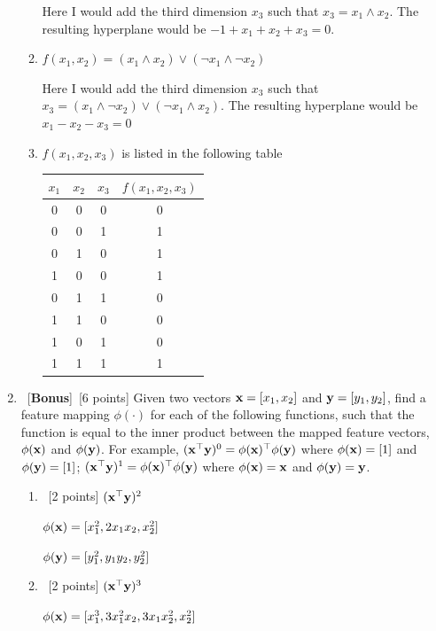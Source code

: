 \documentclass[12pt, fullpage,letterpaper]{article}
\begin{document}
\begin{enumerate}
\begin{enumerate}
		Here I would add the third dimension $x_3$ such that $x_3 = x_1 \land x_2$. The resulting hyperplane would be $-1 + x_1 + x_2 + x_3 = 0$.
		
		\item $f(x_1, x_2) = (x_1 \land x_2) \lor (\neg x_1 \land \neg x_2)$
		
		Here I would add the third dimension $x_3$ such that $x_3 = (x_1 \land \neg x_2) \lor (\neg x_1 \land x_2)$. The resulting hyperplane would be $x_1 - x_2 - x_3 = 0$
		
		\item $f(x_1, x_2, x_3)$ is listed in the following table
		\begin{table}[h]
			\centering
			\begin{tabular}{ccc|c}
				$x_1$ & $x_2$ & $x_3$ &  $f(x_1, x_2, x_3)$\\ 
				\hline\hline
				0 & 0 & 0 & 0 \\ \hline
				0 & 0 & 1 & 1 \\ \hline
				0 & 1 & 0 & 1 \\ \hline
				1 & 0 & 0 & 1 \\ \hline
				0 & 1 & 1 & 0\\ \hline
				1 & 1 & 0 & 0\\ \hline
				1 & 0 & 1 & 0\\ \hline
				1 & 1 & 1 & 1\\ \hline
			\end{tabular}
		\end{table}
	\end{enumerate}
	
	\item~[\textbf{Bonus}]~[6 points]  Given two vectors ${\bf x} = [x_1,  x_2]$ and ${\bf y}=[y_1,  y_2]$, find a feature mapping $\phi(\cdot)$ for each of the following functions, such that the function is equal to the inner product between the mapped feature vectors, $\phi({\bf x})$ and $\phi({\bf y})$. For example, $({\bf x}^\top {\bf y})^0 = \phi({\bf x})^\top \phi({\bf y})$ where $\phi({\bf x}) = [1]$ and $\phi({\bf y}) = [1]$; $({\bf x}^\top {\bf y})^1 = \phi({\bf x})^\top \phi({\bf y})$ where $\phi({\bf x}) = {\bf x}$ and $\phi({\bf y}) = {\bf y}$. 
	\begin{enumerate}
		\item~[2 points] $({\bf x}^\top {\bf y})^2$
		
		$\phi({\bf x}) = [x_1^2, 2x_1x_2, x_2^2]$
		
		$\phi({\bf y}) = [y_1^2, y_1y_2, y_2^2]$
		\item~[2 points] $({\bf x}^\top {\bf y})^3$
		
		$\phi({\bf x}) = [x_1^3, 3x_1^2x_2, 3x_1x_2^2, x_2^2]$
		

\end{enumerate}
\end{enumerate}
\end{document}
